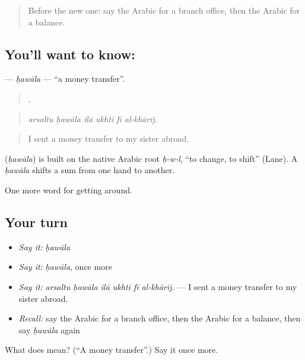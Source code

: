 \begin{quote}
Before the new one: say the Arabic for a branch office, then the Arabic for a balance.
\end{quote}

\subsection*{You'll want to know: }
\textbf{} — \emph{ḥawāla} — \textquotedblleft{}a money transfer\textquotedblright{}.

\begin{quote}
     .
\end{quote}

\begin{quote}
\emph{arsaltu ḥawāla ilā ukhtī fī al-khārij.}
\end{quote}

\begin{quote}
I sent a money transfer to my sister abroad.
\end{quote}

\begin{cousinweb}
\textbf{} (\emph{ḥawāla}) is built on the native Arabic root \emph{ḥ-w-l}, \textquotedblleft{}to change, to shift\textquotedblright{} (Lane). A \emph{ḥawāla} shifts a sum from one hand to another.
\end{cousinweb}

\begin{grammarlens}[title={What you've built}]
One more word for getting around.
\end{grammarlens}

\subsection*{Your turn}
\begin{itemize}
\raggedright
  \item \emph{Say it:} \emph{ḥawāla}
  \item \emph{Say it:} \emph{ḥawāla}, once more
  \item \emph{Say it:} \emph{arsaltu ḥawāla ilā ukhtī fī al-khārij.} — I sent a money transfer to my sister abroad.
  \item \emph{Recall:} say the Arabic for a branch office, then the Arabic for a balance, then say \emph{ḥawāla} again
\end{itemize}

\begin{tcolorbox}[breakable,colback=teal!4,colframe=teal!35!black,title={Before you move on}]
What does  mean? (\textquotedblleft{}A money transfer\textquotedblright{}.) Say it once more.
\end{tcolorbox}
